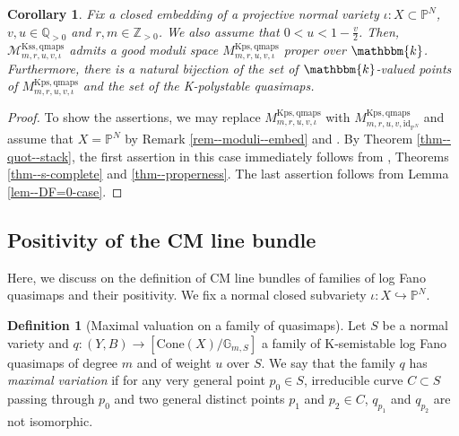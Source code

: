 \documentclass[12pt,twoside]{amsart}
\newtheorem{cor}[thm]{Corollary}
\theoremstyle{definition}
\newtheorem{defn}[thm]{Definition}
\begin{document}
\begin{cor}
Fix a closed embedding of a projective normal variety $\iota\colon X\subset \mathbb{P}^N$, $v,u\in\mathbb{Q}_{>0}$ and $r,m\in\mathbb{Z}_{>0}$. 
We also assume that $0<u<1-\frac{v}{2}$.  
Then,     $\mathcal{M}^{\mathrm{Kss,qmaps}}_{m,r,u,v,\iota}$ admits a good moduli space $M^{\mathrm{Kps,qmaps}}_{m,r,u,v,\iota}$ proper over $\mathbbm{k}$. 
Furthermore, there is a natural bijection of the set of $\mathbbm{k}$-valued points of $M^{\mathrm{Kps,qmaps}}_{m,r,u,v,\iota}$ and the set of the K-polystable quasimaps.
\end{cor}

\begin{proof}
To show the assertions, we may replace $M^{\mathrm{Kps,qmaps}}_{m,r,u,v,\iota}$ with $M^{\mathrm{Kps,qmaps}}_{m,r,u,v,\mathrm{id}_{\mathbb{P}^N}}$ and assume that $X=\mathbb{P}^N$ by Remark \ref{rem--moduli--embed} and  \cite[Lemma 4.14]{alper}.
   By Theorem \ref{thm--quot--stack}, the first assertion in this case immediately follows from \cite[Theorem A]{AHLH}, Theorems \ref{thm--s-complete} and \ref{thm--properness}.
   The last assertion follows from Lemma \ref{lem--DF=0-case}.
\end{proof}



\subsection{Positivity of the CM line bundle}\label{subsection--projectivity}




Here, we discuss on the definition of CM line bundles of families of log Fano quasimaps and their positivity. 
We fix a normal closed subvariety $\iota\colon X\hookrightarrow \mathbb{P}^N$.

\begin{defn}[Maximal valuation on a family of quasimaps]
    Let $S$ be a normal variety and $q\colon (Y,B)\to [\mathrm{Cone}(X)/\mathbb{G}_{m,S}]$ a family of K-semistable log Fano quasimaps of degree $m$ and of weight $u$ over $S$.
    We say that the family $q$ has {\em maximal variation} if for any very general point $p_0 \in S$, irreducible curve $C \subset S$ passing through $p_0$ and two general distinct points $p_1$ and $p_2\in C$, $q_{p_1}$ and $q_{p_2}$ are not isomorphic.
\end{defn}
\end{document}
